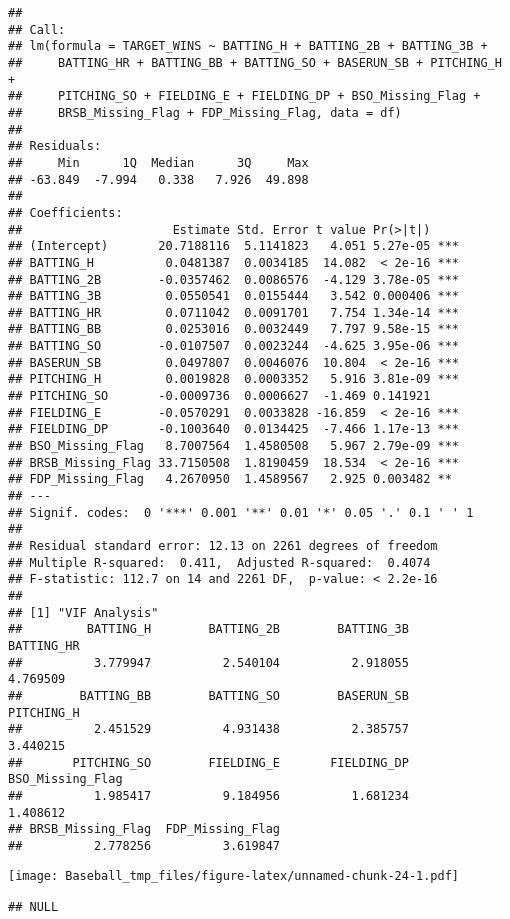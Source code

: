 \documentclass[
]{article}
\begin{document}
\begin{verbatim}
## 
## Call:
## lm(formula = TARGET_WINS ~ BATTING_H + BATTING_2B + BATTING_3B + 
##     BATTING_HR + BATTING_BB + BATTING_SO + BASERUN_SB + PITCHING_H + 
##     PITCHING_SO + FIELDING_E + FIELDING_DP + BSO_Missing_Flag + 
##     BRSB_Missing_Flag + FDP_Missing_Flag, data = df)
## 
## Residuals:
##     Min      1Q  Median      3Q     Max 
## -63.849  -7.994   0.338   7.926  49.898 
## 
## Coefficients:
##                     Estimate Std. Error t value Pr(>|t|)    
## (Intercept)       20.7188116  5.1141823   4.051 5.27e-05 ***
## BATTING_H          0.0481387  0.0034185  14.082  < 2e-16 ***
## BATTING_2B        -0.0357462  0.0086576  -4.129 3.78e-05 ***
## BATTING_3B         0.0550541  0.0155444   3.542 0.000406 ***
## BATTING_HR         0.0711042  0.0091701   7.754 1.34e-14 ***
## BATTING_BB         0.0253016  0.0032449   7.797 9.58e-15 ***
## BATTING_SO        -0.0107507  0.0023244  -4.625 3.95e-06 ***
## BASERUN_SB         0.0497807  0.0046076  10.804  < 2e-16 ***
## PITCHING_H         0.0019828  0.0003352   5.916 3.81e-09 ***
## PITCHING_SO       -0.0009736  0.0006627  -1.469 0.141921    
## FIELDING_E        -0.0570291  0.0033828 -16.859  < 2e-16 ***
## FIELDING_DP       -0.1003640  0.0134425  -7.466 1.17e-13 ***
## BSO_Missing_Flag   8.7007564  1.4580508   5.967 2.79e-09 ***
## BRSB_Missing_Flag 33.7150508  1.8190459  18.534  < 2e-16 ***
## FDP_Missing_Flag   4.2670950  1.4589567   2.925 0.003482 ** 
## ---
## Signif. codes:  0 '***' 0.001 '**' 0.01 '*' 0.05 '.' 0.1 ' ' 1
## 
## Residual standard error: 12.13 on 2261 degrees of freedom
## Multiple R-squared:  0.411,  Adjusted R-squared:  0.4074 
## F-statistic: 112.7 on 14 and 2261 DF,  p-value: < 2.2e-16
## 
## [1] "VIF Analysis"
##         BATTING_H        BATTING_2B        BATTING_3B        BATTING_HR 
##          3.779947          2.540104          2.918055          4.769509 
##        BATTING_BB        BATTING_SO        BASERUN_SB        PITCHING_H 
##          2.451529          4.931438          2.385757          3.440215 
##       PITCHING_SO        FIELDING_E       FIELDING_DP  BSO_Missing_Flag 
##          1.985417          9.184956          1.681234          1.408612 
## BRSB_Missing_Flag  FDP_Missing_Flag 
##          2.778256          3.619847
\end{verbatim}

\texttt{[image: Baseball\_tmp\_files/figure-latex/unnamed-chunk-24-1.pdf]}

\begin{verbatim}
## NULL
\end{verbatim}
\end{document}

